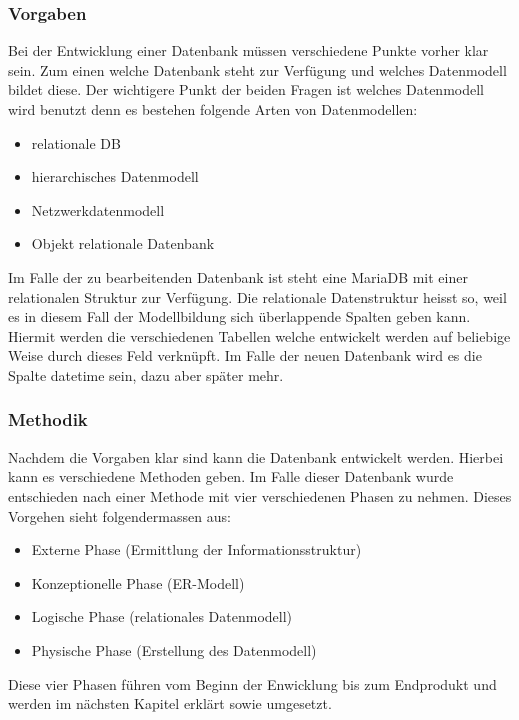 \subsubsection{Vorgaben}
Bei der Entwicklung einer Datenbank müssen verschiedene Punkte vorher klar sein. Zum einen welche Datenbank steht zur Verfügung und welches Datenmodell bildet diese. Der wichtigere Punkt der beiden Fragen ist welches Datenmodell wird benutzt denn es bestehen folgende Arten von Datenmodellen:
\begin{itemize}
\item relationale DB
\item hierarchisches Datenmodell
\item Netzwerkdatenmodell
\item Objekt relationale Datenbank
\end{itemize}

Im Falle der zu bearbeitenden Datenbank ist steht eine MariaDB mit einer relationalen Struktur zur Verfügung. Die relationale Datenstruktur heisst so, weil es in diesem Fall der Modellbildung sich überlappende Spalten geben kann.\cite{IntroductionToRelationalDatabases:MariaDB} Hiermit werden die verschiedenen Tabellen welche entwickelt werden auf beliebige Weise durch dieses Feld verknüpft. Im Falle der neuen Datenbank wird es die Spalte datetime sein, dazu aber später mehr.\\

\subsubsection{Methodik}
Nachdem die Vorgaben klar sind kann die Datenbank entwickelt werden. Hierbei kann es verschiedene Methoden geben. Im Falle dieser Datenbank wurde entschieden nach einer Methode mit vier verschiedenen Phasen zu nehmen. \cite{Datenbanken:GrundlagenUndEntwurf:VeikkoKrypczyk} Dieses Vorgehen sieht folgendermassen aus:
\begin{itemize}
\item Externe Phase (Ermittlung der Informationsstruktur)
\item Konzeptionelle Phase (ER-Modell)
\item Logische Phase (relationales Datenmodell)
\item Physische Phase (Erstellung des Datenmodell)
\end{itemize}

Diese vier Phasen führen vom Beginn der Enwicklung bis zum Endprodukt und werden im nächsten Kapitel erklärt sowie umgesetzt.
